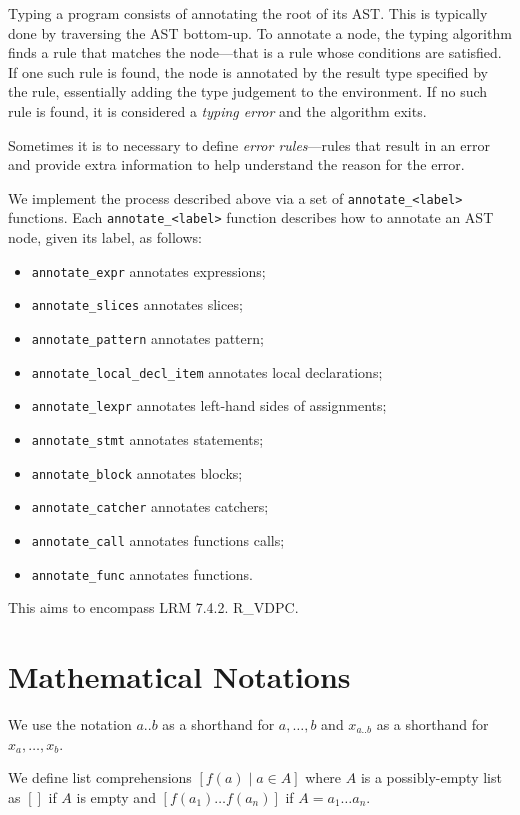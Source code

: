 \documentclass{book}
\begin{document}
Typing a program consists of annotating the root of its AST. This is typically
done by traversing the AST bottom-up.  To annotate a node, the typing algorithm
finds a rule that matches the node---that is a rule whose conditions are
satisfied. If one such rule is found, the node is annotated by the  result type
specified by the rule, essentially adding the type judgement to the
environment.  If no such rule is found, it is considered a \emph{typing error}
and the algorithm exits.

Sometimes it is to necessary to define \emph{error rules}---rules that result
in an error and provide extra information to help understand the reason for the
error.

We implement the process described above via a set of
\texttt{annotate\_<label>} functions. Each \texttt{annotate\_<label>}
function describes how to annotate an AST node, given its label, as follows:\begin{itemize}
\item \texttt{annotate\_expr} annotates expressions;
\item \texttt{annotate\_slices} annotates slices;
\item \texttt{annotate\_pattern} annotates pattern;
\item \texttt{annotate\_local\_decl\_item} annotates local declarations;
\item \texttt{annotate\_lexpr} annotates left-hand sides of assignments;
\item \texttt{annotate\_stmt} annotates statements;
\item \texttt{annotate\_block} annotates blocks;
\item \texttt{annotate\_catcher} annotates catchers;
\item \texttt{annotate\_call} annotates functions calls;
\item \texttt{annotate\_func} annotates functions.
\end{itemize}

This aims to encompass LRM 7.4.2. R\_VDPC.

\section{Mathematical Notations}

We use the notation $a..b$ as a shorthand for $a,\ldots,b$ and $x_{a..b}$ as a shorthand for $x_a,\ldots,x_b$.

We define list comprehensions $[f(a) \;|\; a \in A]$ where $A$ is a possibly-empty list as $[]$ if $A$ is empty and $[f(a_1) \ldots f(a_n)]$ if $A=a_1 \ldots a_n$.
\end{document}
